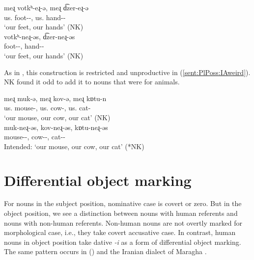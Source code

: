\begin{exe}
	\ex {\iaIA}  \label{sent:PlPoss:IAMoreBody} 
	\begin{xlist}
		\ex \gll  meɻ votkʰ-eɻ-ə, meɻ d͡zer-eɻ-ə  \\
		us.{\gen} foot-{\pl}-{}, us.{\gen} hand-{\pl}-{} \\ 
		\trans `our feet, our hands'  \hfill (NK)\\
		\ex \gll   votkʰ-neɻ-əs, d͡zer-neɻ-əs \\
		foot-{\pl}-{\possFsg}, hand-{\pl}-{\possFsg} \\ 
		\trans `our feet, our hands'  \hfill (NK)\\
	\end{xlist}
\end{exe}

As in {\seaSEA}, this construction is restricted and unproductive in {\iaIA} (\ref{sent:PlPoss:IAweird}). NK found it odd  to add it to nouns that were for animals. 

\begin{exe}
	\ex {\iaIA}  \label{sent:PlPoss:IAweird}
	\begin{xlist}
		\ex \gll  meɻ muk-ə, meɻ kov-ə, meɻ kɒtu-n  \\
		us.{\gen} mouse-{}, us.{\gen} cow-{}, us.{\gen} cat-{} \\ 
		\trans `our mouse, our cow, our cat'  \hfill (NK)\\
		\armenian{մեր մուկը, մեր կովը, մեր կատուն}
		\ex \gll  *muk-neɻ-əs, kov-neɻ-əs, kɒtu-neɻ-əs \\
		mouse-{\pl}-{\possFsg}, cow-{\pl}-{\possFsg}, cat-{\pl}-{\possFsg} \\ 
		\trans Intended: `our mouse, our cow, our cat'  \hfill (*NK)\\
		
	\end{xlist}
\end{exe}



\section{Differential object marking}\label{section:noun:DOM}\largerpage
For nouns in the subject position, nominative case is covert or zero. But in the object position, we see a distinction between nouns with human referents and nouns with non-human referents. Non-human nouns are not overtly marked for morphological case, i.e., they take covert accusative case. In contrast, human nouns in object position take dative \textit{{-i}} as a form of differential object marking. The same pattern occurs in {\seaSEA} (\cites[61]{DumTragut-2009-ArmenianReferenceGrammar}{scala-2011-differentialObjectMarkingEasternArmenian}) and the Iranian dialect of Maragha \citep[160]{Adjarian-1926-MaraghaDialect}.

